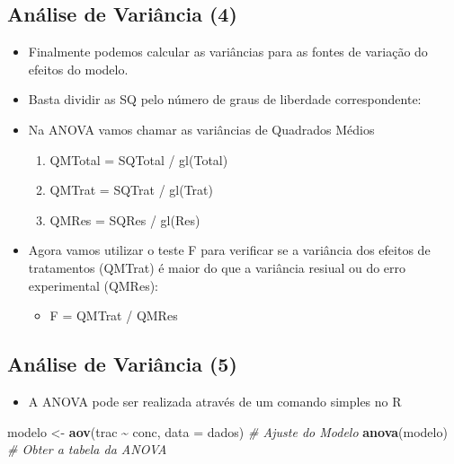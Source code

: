 \documentclass[
]{book}
\newenvironment{Shaded}{\begin{snugshade}}{\end{snugshade}}
\newcommand{\AttributeTok}[1]{\textcolor[rgb]{0.13,0.29,0.53}{#1}}
\newcommand{\CommentTok}[1]{\textcolor[rgb]{0.56,0.35,0.01}{\textit{#1}}}
\newcommand{\FunctionTok}[1]{\textcolor[rgb]{0.13,0.29,0.53}{\textbf{#1}}}
\newcommand{\NormalTok}[1]{#1}
\newcommand{\OtherTok}[1]{\textcolor[rgb]{0.56,0.35,0.01}{#1}}
\newcommand{\SpecialCharTok}[1]{\textcolor[rgb]{0.81,0.36,0.00}{\textbf{#1}}}
\providecommand{\tightlist}{%
  \setlength{\itemsep}{0pt}\setlength{\parskip}{0pt}}
\begin{document}
\subsection{Análise de Variância (4)}\label{anuxe1lise-de-variuxe2ncia-4}

\begin{itemize}
\item
  Finalmente podemos calcular as variâncias para as fontes de variação do efeitos do modelo.
\item
  Basta dividir as SQ pelo número de graus de liberdade correspondente:
\item
  Na ANOVA vamos chamar as variâncias de Quadrados Médios

  \begin{enumerate}
  \def\labelenumi{\alph{enumi})}
  \tightlist
  \item
    QMTotal = SQTotal / gl(Total)
  \item
    QMTrat = SQTrat / gl(Trat)
  \item
    QMRes = SQRes / gl(Res)
  \end{enumerate}
\item
  Agora vamos utilizar o teste F para verificar se a variância dos efeitos de tratamentos (QMTrat) é maior do que a variância resiual ou do erro experimental (QMRes):

  \begin{itemize}
  \tightlist
  \item
    F = QMTrat / QMRes
  \end{itemize}
\end{itemize}

\subsection{Análise de Variância (5)}\label{anuxe1lise-de-variuxe2ncia-5}

\begin{itemize}
\tightlist
\item
  A ANOVA pode ser realizada através de um comando simples no R
\end{itemize}

\begin{Shaded}
\begin{Highlighting}[]
\NormalTok{modelo }\OtherTok{\textless{}{-}} \FunctionTok{aov}\NormalTok{(trac }\SpecialCharTok{\textasciitilde{}}\NormalTok{ conc, }\AttributeTok{data =}\NormalTok{ dados) }\CommentTok{\# Ajuste do Modelo}
\FunctionTok{anova}\NormalTok{(modelo) }\CommentTok{\# Obter a tabela da ANOVA}
\end{Highlighting}
\end{Shaded}
\end{document}
